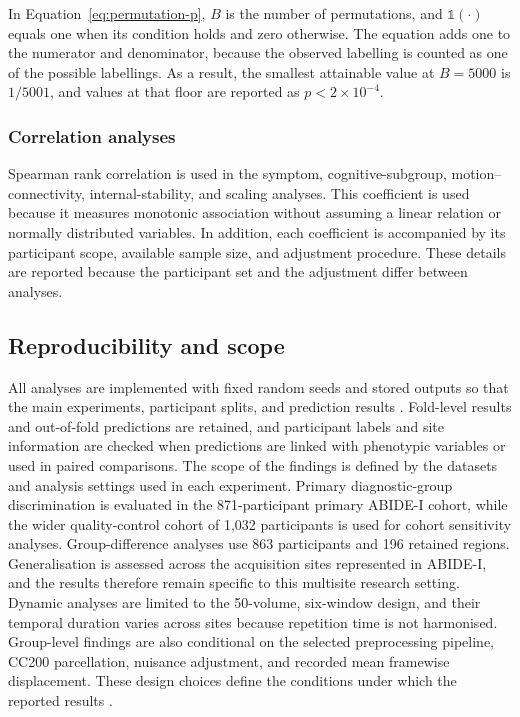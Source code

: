 In Equation~\eqref{eq:permutation-p}, $B$ is the number of permutations, and $\mathbb{1}(\cdot)$
equals one when its condition holds and zero otherwise. The equation adds one to the
numerator and denominator, because the observed labelling is counted as one of the
possible labellings. As a result, the smallest attainable value at $B=5000$ is $1/5001$,
and values at that floor are reported as $p < 2\times10^{-4}$.

\subsubsection{Correlation analyses}
\label{subsubsec:correlation-analyses}

Spearman rank correlation is used in the symptom, cognitive-subgroup,
motion--connectivity, internal-stability, and scaling analyses. This coefficient is used
because it measures monotonic association without assuming a linear relation or normally
distributed variables. In addition, each coefficient is accompanied by its participant
scope, available sample size, and adjustment procedure. These details are reported because
the participant set and the adjustment differ between analyses.

\subsection{Reproducibility and scope}
\label{subsec:reproducibility-scope}

All analyses are implemented with fixed random seeds and stored outputs so that the main experiments, participant splits, and prediction results . Fold-level results and out-of-fold predictions are retained, and participant labels and site information are checked when predictions are linked with phenotypic variables or used in paired comparisons. The scope of the findings is defined by the datasets and analysis settings used in each experiment. Primary diagnostic-group discrimination is evaluated in the 871-participant primary ABIDE-I cohort, while the wider quality-control cohort of 1,032 participants is used for cohort sensitivity analyses. Group-difference analyses use 863 participants and 196 retained regions. Generalisation is assessed across the acquisition sites represented in ABIDE-I, and the results therefore remain specific to this multisite research setting. Dynamic analyses are limited to the 50-volume, six-window design, and their temporal duration varies across sites because repetition time is not harmonised. Group-level findings are also conditional on the selected preprocessing pipeline, CC200 parcellation, nuisance adjustment, and recorded mean framewise displacement. These design choices define the conditions under which the reported results .

